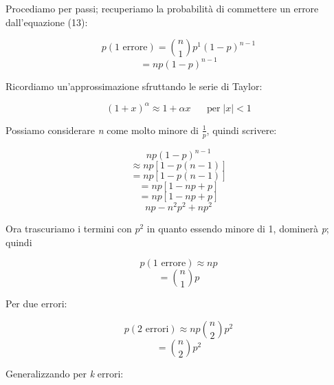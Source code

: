 Procediamo per passi; recuperiamo la probabilità di commettere un errore dall'equazione (13):

\begin{equation}
p(\text{1 errore}) = \binom{n}{1} p^1 (1-p)^{n-1}
\end{equation}
\begin{equation*}
= np(1-p)^{n-1}
\end{equation*}

Ricordiamo un'approssimazione sfruttando le serie di Taylor:

\begin{equation}
(1+x)^{\alpha} \approx 1 + \alpha x \; \; \; \; \; \; \text{per} \; |x| < 1
\end{equation}

Possiamo considerare \textit{n} come molto minore di $\frac{1}{p}$, quindi scrivere:

\begin{equation}
np(1-p)^{n-1}
\end{equation}
\begin{equation*}
\approx np[1-p(n-1)] 
\end{equation*}
\begin{equation*}
= np[1-p(n-1)]
\end{equation*}
\begin{equation*}
= np[1-np+p]
\end{equation*}
\begin{equation*}
= np[1-np+p]
\end{equation*}
\begin{equation*}
np-n^2p^2+np^2 
\end{equation*}

Ora trascuriamo i termini con $p^2$ in quanto essendo minore di 1, dominerà \textit{p}; quindi

\begin{equation}
p(\text{1 errore})\approx np
\end{equation}
\begin{equation*}
= \binom{n}{1}p
\end{equation*}

Per due errori:

\begin{equation}
p(\text{2 errori})\approx np \binom{n}{2}p^2
\end{equation}
\begin{equation*}
= \binom{n}{2}p^2
\end{equation*}

Generalizzando per \textit{k} errori:

